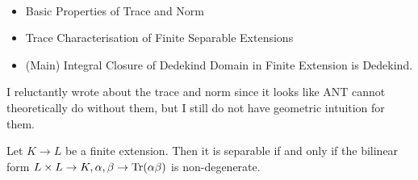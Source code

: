 \documentclass[./main.tex]{subfiles}
\begin{document}
  
\begin{rmk}~
  
  \begin{itemize}
    \item Basic Properties of Trace and Norm
    \item Trace Characterisation of Finite Separable Extensions
    \item (Main) Integral Closure of Dedekind Domain in Finite 
    Extension is Dedekind. 
  \end{itemize}

  I reluctantly wrote about the trace and norm
  since it looks like ANT cannot theoretically do without them,  
  but I still do not have geometric intuition for them. 
\end{rmk}

\begin{prop}
  
  Let $K \to L$ be a finite extension.
  Then it is separable if and only if 
  the bilinear form $L \times L \to K, \alpha,\beta \to \operatorname{Tr} (\alpha \beta)$
  is non-degenerate. 
\end{prop}
\end{document}
